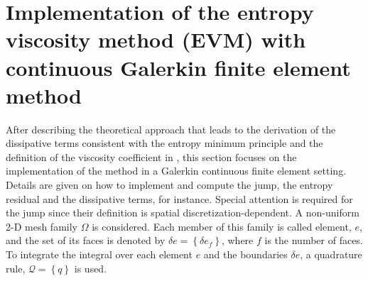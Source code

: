 \section{Implementation of the entropy viscosity method (EVM) with continuous Galerkin finite element method}\label{sect:ev_impl_sect2}
After describing the theoretical approach that leads to the derivation of the dissipative terms consistent with the entropy minimum principle and the definition of the viscosity coefficient in , this section focuses on the implementation of the method in a Galerkin continuous finite element setting. Details are given on how to implement and compute the jump, the entropy residual and the dissipative terms, for instance. Special attention is required for the jump since their definition is spatial discretization-dependent. A non-uniform 2-D mesh family $\Omega$ is considered. Each member of this family is called element, $e$, and the set of its faces is denoted by $\delta e = \left\{ \delta e_f \right\}$, where $f$ is the number of faces. To integrate the integral over each element $e$ and the boundaries $\delta e$, a quadrature rule, $\mathcal{Q} = \left\{ q \right\}$ is used.

